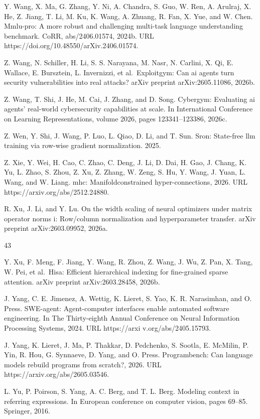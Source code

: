 \documentclass[
  10
]{article}
\begin{document}
Y. Wang, X. Ma, G. Zhang, Y. Ni, A. Chandra, S. Guo, W. Ren, A. Arulraj,
X. He, Z. Jiang, T. Li, M. Ku, K. Wang, A. Zhuang, R. Fan, X. Yue, and
W. Chen. Mmlu-pro: A more robust and challenging multi-task language
understanding benchmark. CoRR, abs/2406.01574, 2024b. URL
https://doi.org/10.48550/arXiv.2406.01574.

Z. Wang, N. Schiller, H. Li, S. S. Narayana, M. Nasr, N. Carlini, X. Qi,
E. Wallace, E. Bursztein, L. Invernizzi, et al.~Exploitgym: Can ai
agents turn security vulnerabilities into real attacks? arXiv preprint
arXiv:2605.11086, 2026b.

Z. Wang, T. Shi, J. He, M. Cai, J. Zhang, and D. Song. Cybergym:
Evaluating ai agents' real-world cybersecurity capabilities at scale. In
International Conference on Learning Representations, volume 2026, pages
123341--123386, 2026c.

Z. Wen, Y. Shi, J. Wang, P. Luo, L. Qiao, D. Li, and T. Sun. Sron:
State-free llm training via row-wise gradient normalization. 2025.

Z. Xie, Y. Wei, H. Cao, C. Zhao, C. Deng, J. Li, D. Dai, H. Gao, J.
Chang, K. Yu, L. Zhao, S. Zhou, Z. Xu, Z. Zhang, W. Zeng, S. Hu, Y.
Wang, J. Yuan, L. Wang, and W. Liang. mhc: Manifoldconstrained
hyper-connections, 2026. URL https://arxiv.org/abs/2512.24880.

R. Xu, J. Li, and Y. Lu. On the width scaling of neural optimizers under
matrix operator norms i: Row/column normalization and hyperparameter
transfer. arXiv preprint arXiv:2603.09952, 2026a.

43

Y. Xu, F. Meng, F. Jiang, Y. Wang, R. Zhou, Z. Wang, J. Wu, Z. Pan, X.
Tang, W. Pei, et al.~Hisa: Efficient hierarchical indexing for
fine-grained sparse attention. arXiv preprint arXiv:2603.28458, 2026b.

J. Yang, C. E. Jimenez, A. Wettig, K. Lieret, S. Yao, K. R. Narasimhan,
and O. Press. SWE-agent: Agent-computer interfaces enable automated
software engineering. In The Thirty-eighth Annual Conference on Neural
Information Processing Systems, 2024. URL https://arxi
v.org/abs/2405.15793.

J. Yang, K. Lieret, J. Ma, P. Thakkar, D. Pedchenko, S. Sootla, E.
McMilin, P. Yin, R. Hou, G. Synnaeve, D. Yang, and O. Press.
Programbench: Can language models rebuild programs from scratch?, 2026.
URL https://arxiv.org/abs/2605.03546.

L. Yu, P. Poirson, S. Yang, A. C. Berg, and T. L. Berg. Modeling context
in referring expressions. In European conference on computer vision,
pages 69--85. Springer, 2016.
\end{document}
